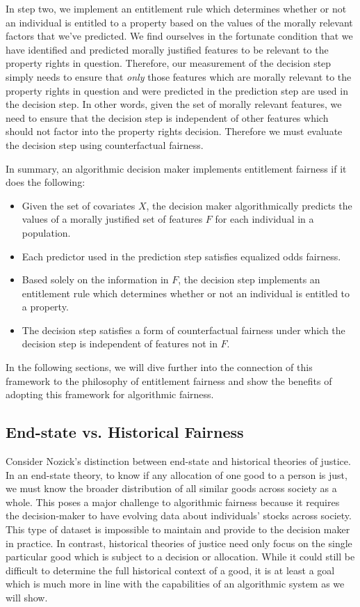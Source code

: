 In step two, we implement an entitlement rule which determines whether or not
an individual is entitled to a property based on the values of the morally
relevant factors that we've predicted. We find ourselves in the fortunate
condition that we have identified and predicted morally justified features to be
relevant to the property rights in question. Therefore, our measurement of the
decision step simply needs to ensure that \emph{only} those features which are
morally relevant to the property rights in question and were predicted in the
prediction step are used in the decision step. In other words, given the set of
morally relevant features, we need to ensure that the decision step is
independent of other features which should not factor into the property rights
decision. Therefore we must evaluate the decision step using counterfactual
fairness.

In summary, an algorithmic decision maker implements entitlement fairness if it
does the following:
\begin{itemize}
    \item Given the set of covariates $X$, the decision maker algorithmically
          predicts the values of a morally justified set of features $F$ for each
          individual in a population.
    \item Each predictor used in the prediction step satisfies equalized odds
          fairness.
    \item Based solely on the information in $F$, the decision step implements
          an entitlement rule which determines whether or not an individual is
          entitled to a property.
    \item The decision step satisfies a form of counterfactual fairness under
          which the decision step is independent of features not in $F$.
\end{itemize}

In the following sections, we will dive further into the connection of this 
framework to the philosophy of entitlement fairness and show the benefits of
adopting this framework for algorithmic fairness.

\subsection{End-state vs. Historical Fairness}

Consider Nozick's distinction between end-state and historical theories of
justice. In an end-state theory, to know if any allocation of one good to a
person is just, we must know the broader distribution of all similar goods
across society as a whole. This poses a major challenge to algorithmic fairness
because it requires the decision-maker to have evolving data about individuals'
stocks across society. This type of dataset is impossible to maintain and
provide to the decision maker in practice. In contrast, historical theories of
justice need only focus on the single particular good which is subject to a
decision or allocation. While it could still be difficult to determine the full
historical context of a good, it is at least a goal which is much more in line
with the capabilities of an algorithmic system as we will show.

